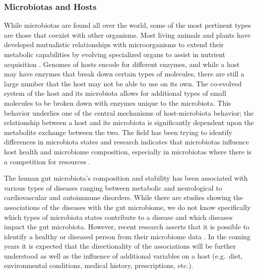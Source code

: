 \subsubsection{Microbiotas and Hosts}\label{intro-allbiota}
While microbiotas are found all over the world, some of the most pertinent types are those that coexist with other organisms. Most living animals and plants have developed mutualistic relationships with microorganisms to extend their metabolic capabilities by evolving specialized organs to assist in nutrient acquisition \citep{Hacquard2015}. Genomes of hosts encode for different enzymes, and while a host may have enzymes that break down certain types of molecules, there are still a large number that the host may not be able to use on its own. The co-evolved system of the host and its microbiota allows for additional types of small molecules to be broken down with enzymes unique to the microbiota. This behavior underlies one of the central mechanisms of host-microbiota behavior; the relationship between a host and its microbiota is significantly dependent upon the metabolite exchange between the two. The field has been trying to identify differences in microbiota states and research indicates that microbiotas influence host health and microbiome composition, especially in microbiotas where there is a competition for resources \citep{Hacquard2015}. 

The human gut microbiota's composition and stability has been associated with various types of diseases ranging between metabolic and neurological to cardiovascular and autoimmune disorders. While there are studies showing the associations of the diseases with the gut microbiome, we do not know specifically which types of microbiota states contribute to a disease and which diseases impact the gut microbiota. However, recent research asserts that it is possible to identify a healthy or diseased person from their microbiome data \citep{Duvallet2017}. In the coming years it is expected that the directionality of the associations will be further understood as well as the influence of additional variables on a host (e.g.\ diet, environmental conditions, medical history, prescriptions, etc.).

